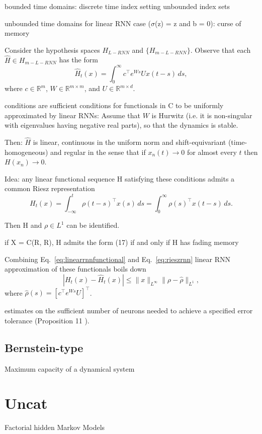 \documentclass{article}
\theoremstyle{definition}
\theoremstyle{remark}
\begin{document}
bounded time domains:
discrete time index setting \citep{gonon2023approximation}
unbounded index sets \citep{hanson2020universal}

unbounded time domains for linear RNN case ($\sigma$(z) = z and b = 0): 
curse of memory \citep{li2020curse}
\citep{li2022approximation}

Consider the hypothesis spaces \( H_{L-RNN} \) and \( \{ H_{m-L-RNN} \} \). Observe that each \( \hat{H} \in H_{m-L-RNN} \) has the form
\begin{equation}\label{eq:linearrnnfunctional}
\hat{H}_t(x) = \int_{0}^{\infty} c^\top e^{W s} U x(t - s) \, ds,
\end{equation}
where \( c \in \mathbb{R}^m \), \( W \in \mathbb{R}^{m \times m} \), and \( U \in \mathbb{R}^{m \times d} \).

conditions are sufficient conditions for functionals in C to be uniformly approximated by linear RNNs: 
Assume that $W$ is Hurwitz (i.e. it is non-singular with eigenvalues having negative real parts), so that the dynamics is stable.

Then: $\hat{H}$ is linear, continuous in the uniform norm and shift-equivariant (time-homogeneous) and regular in the sense that if $x_n(t) \rightarrow 0$ for almost every $t$ then $H(x_n) \rightarrow 0$.



Idea: 
any linear functional sequence H satisfying these conditions admits a common Riesz representation
\begin{equation}\label{eq:rieszrnn}
H_t(x) = \int_{-\infty}^{t} \rho(t - s)^\top x(s) \, ds = \int_{0}^{\infty} \rho(s)^\top x(t - s) \, ds.
\end{equation}

Then H and $\rho \in L^1$ can be identified.
    


if X = C(R, R), H admits the form (17) if and only if H has fading memory \citep{boyd1985fading}


Combining Eq.~\ref{eq:linearrnnfunctional} and Eq.~\ref{eq:rieszrnn}
linear RNN approximation of these functionals boils down
\begin{equation}\label{eq:linearrnnapprox}
|H_t(x) - \hat{H}_t(x)| \leq \|x\|_{L^\infty} \|\rho - \hat{\rho}\|_{L^1},
\end{equation}
where $\hat{\rho}(s) = [c^\top e^{W s} U]^\top$.


estimates on the sufficient number of neurons needed to achieve a specified error tolerance (Proposition 11 \citep{hanson2020universal}). 

\subsection{Bernstein-type}
Maximum capacity of a dynamical system\citep{dambre2012}




\newpage
\section{Uncat}
Factorial hidden Markov Models \citep{ghahramani1995factorial}

\newpage

\end{document}
